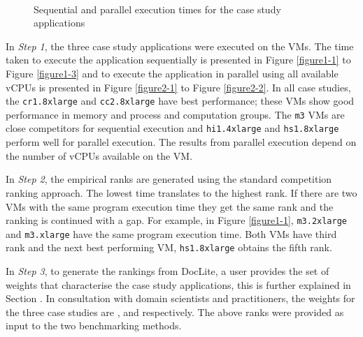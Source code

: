 \begin{figure*}[ht]
\centering
	 \hfill
	 \hfill
	\\
	 \hfill
	 \hfill
\caption{Sequential and parallel execution times for the case study applications}
\label{figure11}
\end{figure*}

In \textit{Step 1}, the three case study applications were executed on the VMs. The time taken to execute the application sequentially is presented in Figure \ref{figure1-1} to Figure \ref{figure1-3} and to execute the application in parallel using all available vCPUs is presented in Figure \ref{figure2-1} to Figure \ref{figure2-2}. In all case studies, the \texttt{cr1.8xlarge} and \texttt{cc2.8xlarge} have best performance; these VMs show good performance in memory and process and computation groups. The \texttt{m3} VMs are close competitors for sequential execution and \texttt{hi1.4xlarge} and \texttt{hs1.8xlarge} perform well for parallel execution. 
The results from parallel execution depend on the number of vCPUs available on the VM.

In \textit{Step 2}, the empirical ranks are generated using the standard competition ranking approach. The lowest time translates to the highest rank. If there are two VMs with the same program execution time they get the same rank and the ranking is continued with a gap. For example, in Figure \ref{figure1-1}, \texttt{m3.2xlarge} and \texttt{m3.xlarge} have the same program execution time. Both VMs have third rank and the next best performing VM, \texttt{hs1.8xlarge} obtains the fifth rank. 

In \textit{Step 3}, to generate the rankings from DocLite, a user provides the set of weights  that characterise the case study applications, this is further explained in Section \cite{lightweight}. In consultation with domain scientists and practitioners, the weights for the three case studies are ,  and  respectively. The above ranks were provided as input to the two benchmarking methods. 

